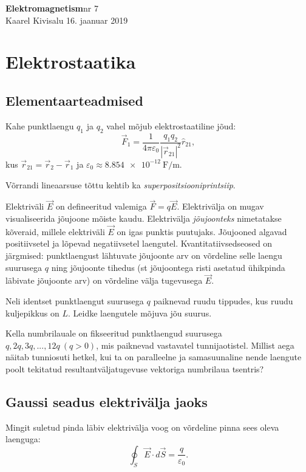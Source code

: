 \documentclass[a4paper,11pt,twocolumn]{article}
\begin{document}
{\huge \textbf{Elektromagnetism}\hfill \normalsize{nr 7}} \\
{Kaarel Kivisalu \hfill 16. jaanuar 2019}



\section{Elektrostaatika}
\subsection{Elementaarteadmised}
Kahe punktlaengu \( q_1 \) ja \( q_2 \) vahel mõjub elektrostaatiline jõud:
\begin{equation*}
\vec{F}_{1} = \dfrac{1}{4\pi\varepsilon_0 }\dfrac{q_1 q_2}{|\vec{r}_{21}|^2}\hat{r}_{21} \tag{Coulomb'i seadus},
\end{equation*}
kus \( \vec{r}_{21}=\vec{r}_2-\vec{r}_1 \) ja \( \varepsilon_0\approx\SI{8.854e-12}{\F\per\m} \).

Võrrandi lineaarsuse tõttu kehtib ka \textit{superpositsiooniprintsiip}.

Elektriväli \( \vec{E} \) on defineeritud valemiga \( \vec{F}=q\vec{E} \). Elektrivälja on mugav visualiseerida jõujoone mõiste kaudu. Elektrivälja \textit{jõujoonteks} nimetatakse kõveraid, millele elektriväli \( \vec{E} \) on igas punktis puutujaks. Jõujooned algavad positiivsetel ja lõpevad negatiivsetel laengutel. Kvantitatiivsedseosed on järgmised: punktlaengust lähtuvate jõujoonte arv on võrdeline selle laengu suurusega \( q \) ning jõujoonte tihedus (st jõujoontega risti asetatud ühikpinda läbivate jõujoonte arv) on võrdeline välja tugevusega \( \vec{E} \).

\begin{question}
	Neli identset punktlaengut suurusega \( q \) paiknevad ruudu tippudes, kus ruudu kuljepikkus on \( L \). Leidke laengutele mõjuva jõu suurus.
\end{question}

\begin{question}
	Kella numbrilauale on fikseeritud punktlaengud suurusega \( q, 2q, 3q,..., 12q\ (q > 0) \), mis paiknevad vastavatel tunnijaotistel. Millist aega näitab tunniosuti hetkel, kui ta on paralleelne ja samasuunaline nende laengute poolt tekitatud resultantväljatugevuse vektoriga numbrilaua tsentris?
\end{question}

\subsection{Gaussi seadus elektrivälja jaoks}
Mingit suletud pinda läbiv elektrivälja voog on võrdeline pinna sees oleva laenguga: 
\begin{equation*}
\oint_S\vec{E}\cdot d\vec{S}=\frac{q}{\varepsilon_0} \tag{I Maxwelli võrrand}.
\end{equation*}
\end{document}
